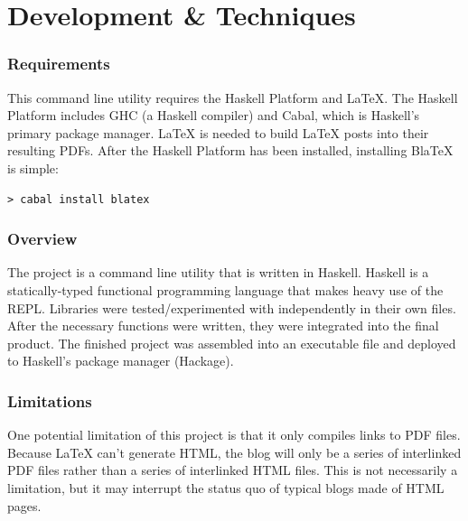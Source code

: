 \documentclass[doc,apacite,12pt]{apa6}
\begin{document}
\section{Development \& Techniques}

\subsubsection{Requirements}
This command line utility requires the Haskell Platform and LaTeX. The Haskell Platform includes GHC (a Haskell compiler) and Cabal, which is Haskell's primary package manager. LaTeX is needed to build LaTeX posts into their resulting PDFs. After the Haskell Platform has been installed, installing BlaTeX is simple:

\begin{lstlisting}
> cabal install blatex
\end{lstlisting}

\subsubsection{Overview}
The project is a command line utility that is written in Haskell. Haskell is a statically-typed functional programming language that makes heavy use of the REPL. Libraries were tested/experimented with independently in their own files. After the necessary functions were written, they were integrated into the final product. The finished project was assembled into an executable file and deployed to Haskell's package manager (Hackage). 

\subsubsection{Limitations}

One potential limitation of this project is that it only compiles links to PDF files. Because LaTeX can't generate HTML, the blog will only be a series of interlinked PDF files rather than a series of interlinked HTML files. This is not necessarily a limitation, but it may interrupt the status quo of typical blogs made of HTML pages. 
\end{document}
